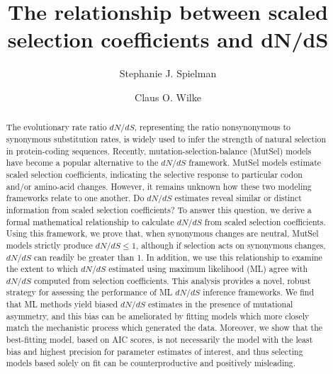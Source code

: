 \documentclass[11pt]{article}
\begin{document}
	
	
\title{The relationship between scaled selection coefficients and dN/dS}
	
\author{Stephanie J. Spielman 
	\and
	Claus O. Wilke
}
	

		
\begin{abstract} 
The evolutionary rate ratio $dN/dS$, representing the ratio nonsynonymous to synonymous substitution rates, is widely used to infer the strength of natural selection in protein-coding sequences.  Recently, mutation-selection-balance (MutSel) models have become a popular alternative to the $dN/dS$ framework. MutSel models estimate scaled selection coefficients, indicating the selective response to particular codon and/or amino-acid changes. However, it remains unknown how these two modeling frameworks relate to one another. Do $dN/dS$ estimates reveal similar or distinct information from scaled selection coefficients? To answer this question, we derive a formal mathematical relationship to calculate $dN/dS$ from scaled selection coefficients. Using this framework, we prove that, when synonymous changes are neutral, MutSel models strictly produce $dN/dS \leq 1$, although if selection acts on synonymous changes, $dN/dS$ can readily be greater than 1. In addition, we use this relationship to examine the extent to which $dN/dS$ estimated using maximum likelihood (ML) agree with $dN/dS$ computed from selection coefficients. This analysis provides a novel, robust strategy for assessing the performance of ML $dN/dS$ inference frameworks. We find that ML methods yield biased $dN/dS$ estimates in the presence of mutational asymmetry, and this bias can be ameliorated by fitting models which more closely match the mechanistic process which generated the data. Moreover, we show that the best-fitting model, based on AIC scores, is not necessarily the model with the least bias and highest precision for parameter estimates of interest, and thus selecting models based solely on fit can be counterproductive and positively misleading. 
\end{abstract}
		
\end{document}
